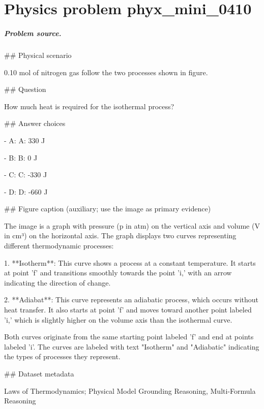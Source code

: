 
\chapter{Physics problem phyx\_mini\_0410}
\label{ch:PhyXMiniProblems_problem_phyx_mini_0410}

\paragraph{Problem source.}
\#\# Physical scenario

0.10 mol of nitrogen gas follow the two processes shown in figure.

\#\# Question

How much heat is required for the isothermal process?

\#\# Answer choices

- A: A: 330 J

- B: B: 0 J

- C: C: -330 J

- D: D: -660 J

\#\# Figure caption (auxiliary; use the image as primary evidence)

The image is a graph with pressure (p in atm) on the vertical axis and volume (V in cm³) on the horizontal axis. The graph displays two curves representing different thermodynamic processes:

1. **Isotherm**: This curve shows a process at a constant temperature. It starts at point 'f' and transitions smoothly towards the point 'i,' with an arrow indicating the direction of change.

2. **Adiabat**: This curve represents an adiabatic process, which occurs without heat transfer. It also starts at point 'f' and moves toward another point labeled 'i,' which is slightly higher on the volume axis than the isothermal curve.

Both curves originate from the same starting point labeled 'f' and end at points labeled 'i'. The curves are labeled with text "Isotherm" and "Adiabatic" indicating the types of processes they represent.

\#\# Dataset metadata

Laws of Thermodynamics; Physical Model Grounding Reasoning, Multi-Formula Reasoning

